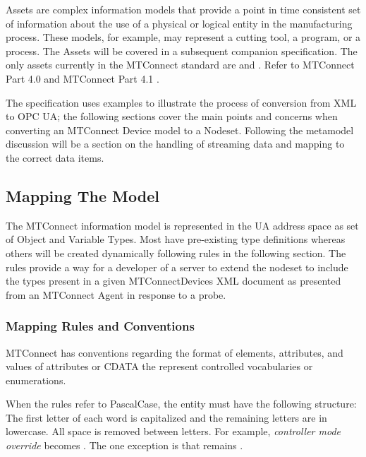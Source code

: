 \glspl{Asset} are complex information models that provide a point in time consistent set of information about the use of a physical or logical entity in the manufacturing process. These models, for example, may represent a cutting tool, a program, or a process. The \glspl{Asset} will be covered in a subsequent companion specification. The only assets currently in the MTConnect standard are  and . Refer to MTConnect Part 4.0 \cite{MTCPart40} and MTConnect Part 4.1 \cite{MTCPart41}.

The specification uses examples to illustrate the process of conversion from XML to OPC UA; the following sections cover the main points and concerns when converting an MTConnect Device model to a Nodeset. Following the metamodel discussion will be a section on the handling of streaming data and mapping to the correct data items. 

\subsection{Mapping The Model}
\lstset{language=XML,numbers=left,xleftmargin=2em}

The MTConnect information model is represented in the UA address space as set of \gls{Object} and \gls{Variable} \glspl{Type}. Most have pre-existing type definitions whereas others will be created dynamically following rules in the following section. The rules provide a way for a developer of a server to extend the nodeset to include the types present in a given MTConnectDevices XML document as presented from an MTConnect \gls{Agent} in response to a \gls{probe}.

\subsubsection{Mapping Rules and Conventions}\label{sec:mapping-rules}

MTConnect has conventions regarding the format of elements, attributes, and values of attributes or CDATA the represent controlled vocabularies or enumerations. 

When the rules refer to \gls{PascalCase}, the entity must have the following structure: The first letter of each word is capitalized and the remaining letters are in lowercase. All space is removed between letters. For example, \textit{controller mode override} becomes . The one exception is  that remains .

